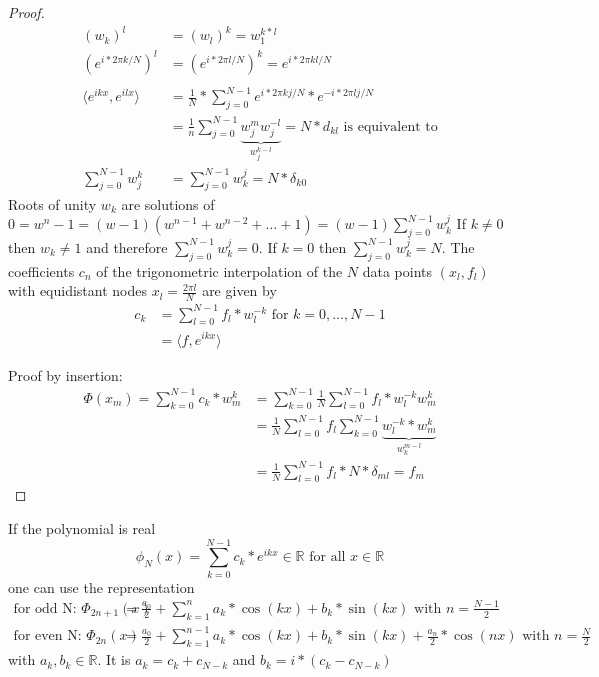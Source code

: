 \begin{proof}
    \begin{align*}
    (w_k)
        ^l &= (w_l)^k = w_1^{k*l}\\
        \left( e^{i*2 \pi k / N} \right)^l &= \left( e^{i*2 \pi l / N} \right)^k = e^{i*2 \pi kl / N}\\
        \\
        \langle e^{ikx}, e^{ilx} \rangle &= \frac{1}{N} * \sum_{j=0}^{N-1} e^{i*2 \pi k j / N} * e^{-i*2 \pi l j / N}\\
        &= \frac{1}{n} \sum_{j=0}^{N-1} \underbrace{w_j^m w_j^{-l}}_{w_j^{k-l}} = N * d_{kl} \text{ is equivalent to}\\
        \sum_{j=0}^{N-1}w_j^k &= \sum_{j=0}^{N-1} w_k^{j} = N * \delta_{k0}
    \end{align*}
    Roots of unity $w_k$ are solutions of $0 = w^n-1 = (w-1)(w^{n-1}+w^{n-2}+\ldots+1) = (w-1) \sum_{j=0}^{N-1} w_k^j$
    If $k \neq 0$ then $w_k \neq 1$ and therefore $\sum_{j=0}^{N-1} w_k^j = 0$.
    If $k=0$ then $\sum_{j=0}^{N-1} w_k^j = N$.
    The coefficients $c_n$ of the trigonometric interpolation of the $N$ data points $(x_l, f_l)$ with equidistant nodes $x_l = \frac{2 \pi l}{N}$ are given by
    \begin{align*}
        c_k &= \sum_{l=0}^{N-1} f_l * w_l^{-k} \text{ for } k = 0, \ldots, N-1\\
        &= \langle f, e^{ikx} \rangle
    \end{align*}

    Proof by insertion:
    \begin{align*}
        \Phi(x_m)=\sum_{k=0}^{N-1} c_k *w_m^k &= \sum_{k=0}^{N-1} \frac{1}{N} \sum_{l=0}^{N-1} f_l * w_l^{-k} w_m^k\\
        &= \frac{1}{N} \sum_{l=0}^{N-1} f_l \sum_{k=0}^{N-1} \underbrace{w_l^{-k}*w_m^k}_{w_k^{m-l}}\\
        &= \frac{1}{N} \sum_{l=0}^{N-1} f_l * N * \delta_{ml} = f_m
    \end{align*}
\end{proof}
\begin{remark}
    If the polynomial is real
    \begin{equation*}
        \phi_N(x) = \sum_{k=0}^{N-1}c_{k}*e^{ikx} \in \mathbb{R} \text{ for all } x \in \mathbb{R}
    \end{equation*}
    one can use the representation
    \begin{align*}
        \text{for odd N: }\Phi_{2n+1}(x) &= \frac{a_0}{2}+\sum_{k=1}^{n} a_k * \cos(kx) + b_k * \sin(kx) \text{ with } n = \frac{N-1}{2}\\
        \text{for even N: } \Phi_{2n}(x) &= \frac{a_0}{2}+\sum_{k=1}^{n-1} a_k * \cos(kx) + b_k * \sin(kx) + \frac{a_n}{2} * \cos(nx) \text{ with } n = \frac{N}{2}
    \end{align*}
    with $a_k, b_k \in \mathbb{R}$.
    It is $a_k = c_k + c_{N-k}$ and $b_k = i *(c_k-c_{N-k})$
\end{remark}
